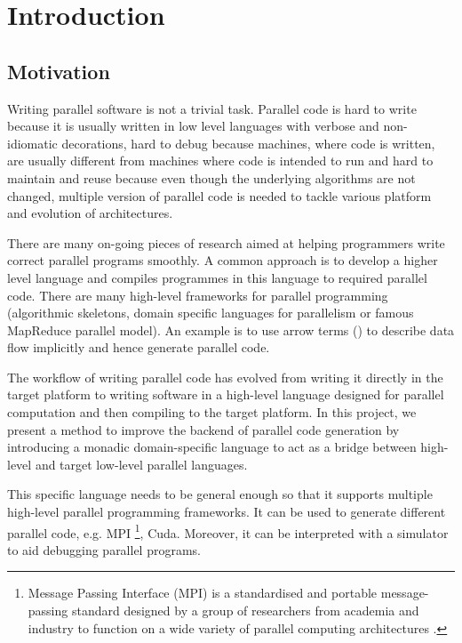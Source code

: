 \chapter{Introduction}
\section{Motivation} \label{i:m}
Writing parallel software is not a trivial task. Parallel code is hard to write because it is usually written in low level languages with verbose and non-idiomatic decorations, hard to debug because machines, where code is written, are usually different from machines where code is intended to run and hard to maintain and reuse because even though the underlying algorithms are not changed, multiple version of parallel code is needed to tackle various platform and evolution of architectures.

There are many on-going pieces of research aimed at helping programmers write correct parallel programs smoothly. A common approach is to develop a higher level language and compiles programmes in this language to required parallel code. There are many high-level frameworks for parallel programming (\eg algorithmic skeletons\cite{coleAlgorithmicSkeletonsStructured}, domain specific languages for parallelism\cite{brownHeterogeneousParallelFramework2011} or famous MapReduce parallel model\cite{liMapReduceParallelProgramming2016}). An example is to use arrow terms () to describe data flow implicitly and hence generate parallel code.

The workflow of writing parallel code has evolved from writing it directly in the target platform to writing software in a high-level language designed for parallel computation and then compiling to the target platform. In this project, we present a method to improve the backend of parallel code generation by introducing a monadic domain-specific language to act as a bridge between high-level and target low-level parallel languages.

This specific language needs to be general enough so that it supports multiple high-level parallel programming frameworks. It can be used to generate different parallel code, e.g. MPI \footnote{Message Passing Interface (MPI) is a standardised and portable message-passing standard designed by a group of researchers from academia and industry to function on a wide variety of parallel computing architectures \cite{MessagePassingInterface2018}.}, Cuda. Moreover, it can be interpreted with a simulator to aid debugging parallel programs.

